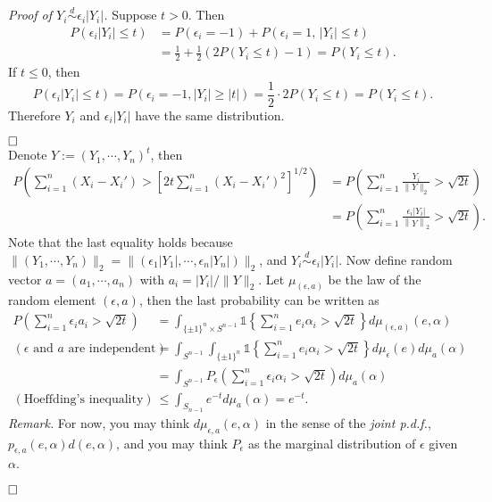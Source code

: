 \documentclass[12pt]{extarticle}
\begin{document}
\textit{Proof of $Y_i\overset{d}{\sim}\epsilon_i|Y_i|$.} Suppose $t>0$. Then
\[
\begin{aligned}
P(\epsilon_i|Y_i|\leq t)
&=
P(\epsilon_i=-1)+P(\epsilon_i=1,\,|Y_i|\leq t)
\\&=
\frac{1}{2}+\frac{1}{2}(2P(Y_i\leq t)-1)=P(Y_i\leq t).
\end{aligned}
\]
If $t\leq 0$, then
\[
P(\epsilon_i|Y_i|\leq t)=P(\epsilon_i=-1, |Y_i|\geq |t|)=\frac{1}{2}\cdot 2P(Y_i\leq t)=P(Y_i\leq t).
\]
Therefore $Y_i$ and $\epsilon_i|Y_i|$ have the same distribution.

$\hspace{\fill}\square$\\
Denote $Y:=(Y_1,\cdots,Y_n)^t$, then
\[
\begin{aligned}
P\left(\sum_{i=1}^n(X_i-X_i')>\left[2t\sum_{i=1}^n(X_i-X_i')^2\right]^{1/2}\right)
&=
P\left(\sum_{i=1}^n\frac{Y_i}{\|Y\|_2}>\sqrt{2t}
\right)
\\&=
P\left(\sum_{i=1}^n\frac{\epsilon_i|Y_i|}{\left\|Y\right\|_2}>\sqrt{2t}
\right).
\end{aligned}
\]
Note that the last equality holds because $\|(Y_1,\cdots,Y_n)\|_2=\|(\epsilon_1|Y_1|,\cdots,\epsilon_n|Y_n|)\|_2$, and $Y_i\overset{d}{\sim}\epsilon_i|Y_i|$.
Now define random vector $a=(a_1,\cdots,a_n)$ with $a_i=|Y_i|/\|Y\|_2$. Let $\mu_{(\epsilon,a)}$ be the law of the random element $(\epsilon,a)$, then the last probability can be written as
\[
\begin{aligned}
P\left(\sum_{i=1}^n\epsilon_i a_i>\sqrt{2t}\right)
&=
\int_{\{\pm 1\}^n\times S^{n-1}}\mathds{1}\left\{\sum_{i=1}^ne_i\alpha_i>\sqrt{2t}\right\}
d\mu_{(\epsilon,a)}(e,\alpha)
\\(\text{$\epsilon$ and $a$ are independent})&=
\int_{S^{n-1}}\int_{\{\pm 1\}^n}\mathds{1}\left\{\sum_{i=1}^ne_i\alpha_i>\sqrt{2t}\right\}
d\mu_\epsilon(e)d\mu_a(\alpha)
\\&=
\int_{S^{n-1}}P_\epsilon\left(\sum_{i=1}^n\epsilon_i\alpha_i>\sqrt{2t}\right)
d\mu_a(\alpha)
\\(\text{Hoeffding's inequality}) &\leq
\int_{S_{n-1}}e^{-t}d\mu_a(\alpha)=e^{-t}.
\end{aligned}
\]
\textit{Remark.} For now, you may think $d\mu_{\epsilon,a}(e,\alpha)$ in the sense of the \textit{joint p.d.f.}, $p_{\epsilon,a}(e,\alpha)d(e,\alpha)$, and you may think $P_\epsilon$ as the marginal distribution of $\epsilon$ given $\alpha$.

$\hspace{\fill}\square$
\end{document}
